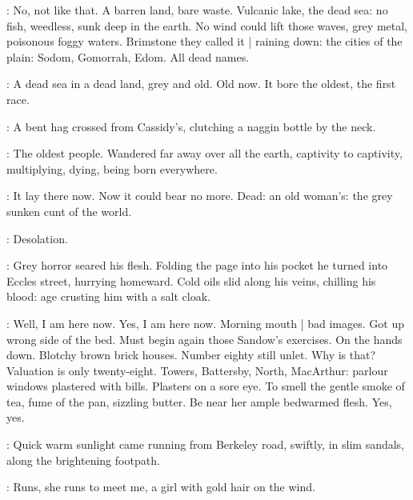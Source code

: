 \BloomInt:
No, not like that.
A barren land, bare waste.
Vulcanic lake, the dead sea:
no fish, weedless, sunk deep in the earth.
No wind could lift those waves,
grey metal, poisonous foggy waters.
Brimstone they called it |
raining down:
the cities of the plain:
Sodom, Gomorrah, Edom.
All dead names.

:
A dead sea in a dead land, grey and old.
Old now.
It bore the oldest, the first race.

:
A bent hag crossed from Cassidy's,
clutching a naggin bottle by the neck.

\BloomInt:
The oldest people.
Wandered far away over all the earth,
captivity to captivity,
multiplying, dying,
being born everywhere.

:
It lay there now.
Now it could bear no more.
Dead:
an old woman's:
the grey sunken cunt of the world.

:
Desolation.

:
Grey horror seared his flesh.
Folding the page into his pocket
he turned into Eccles street,
hurrying homeward.
Cold oils slid along his veins,
chilling his blood:
age crusting him with a salt cloak.

\BloomInt:
Well, I am here now.
Yes, I am here now.
Morning mouth |
bad images.
Got up wrong side of the bed.
Must begin again those Sandow's exercises.
On the hands down.
Blotchy brown brick houses.
Number eighty still unlet.
Why is that?
Valuation is only twenty-eight.
Towers, Battersby, North, MacArthur:
parlour windows plastered with bills.
Plasters on a sore eye.
To smell the gentle smoke of tea,
fume of the pan, sizzling butter.
Be near her ample bedwarmed flesh.
Yes, yes.

:
Quick warm sunlight came running from Berkeley road,
swiftly,
in slim sandals,
along the brightening footpath.

\BloomInt:
Runs, she runs to meet me,
a girl with gold hair on the wind.
